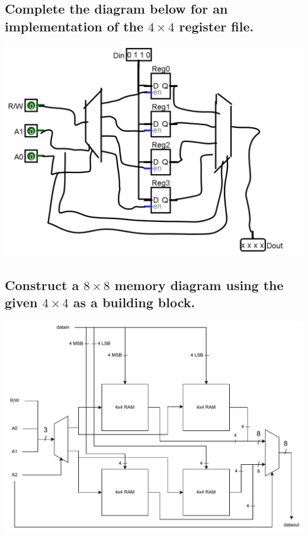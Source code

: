 \documentclass[12pt]{article}
\newenvironment{subquestion}[1]{\subsection{#1}
\begin{tcolorbox}[colback=blue!2!white,colframe=blue!20!white]}{\end{tcolorbox}}
\begin{document}
    \section{}
        \begin{subquestion}{Complete the diagram below for an implementation of the $4\times 4$ register file.}
            \begin{center}
                \includegraphics[scale = 0.5]{Images/4x4.png}
            \end{center}
        \end{subquestion}

        \begin{subquestion}{Construct a $8\times8$ memory diagram using the given $4\times 4$ as a building block.}
            \begin{center}
                \includegraphics[scale=0.5]{Images/8x8 RAM diagram.pdf}
            \end{center}
        \end{subquestion}
        
\end{document}
